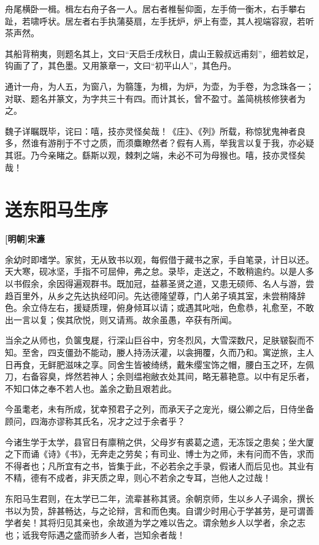 \documentclass[UTF8,titlepage,oneside]{ctexbook}
\begin{document}
舟尾横卧一楫。楫左右舟子各一人。居右者椎髻仰面，左手倚一衡木，右手攀右趾，若啸呼状。居左者右手执蒲葵扇，左手抚炉，炉上有壶，其人视端容寂，若听茶声然。


其船背稍夷，则题名其上，文曰“天启壬戌秋日，虞山王毅叔远甫刻”，细若蚊足，钩画了了，其色墨。又用篆章一，文曰“初平山人”，其色丹。


通计一舟，为人五，为窗八，为篛篷，为楫，为炉，为壶，为手卷，为念珠各一；对联、题名并篆文，为字共三十有四。而计其长，曾不盈寸。盖简桃核修狭者为之。


魏子详瞩既毕，诧曰：嘻，技亦灵怪矣哉！《庄》、《列》所载，称惊犹鬼神者良多，然谁有游削于不寸之质，而须麋瞭然者？假有人焉，举我言以复于我，亦必疑其诳。乃今亲睹之。繇斯以观，棘刺之端，未必不可为母猴也。嘻，技亦灵怪矣哉！



\chapter*{送东阳马生序}
\begin{center}
	\textbf{[明朝]宋濂}
\end{center}

余幼时即嗜学。家贫，无从致书以观，每假借于藏书之家，手自笔录，计日以还。天大寒，砚冰坚，手指不可屈伸，弗之怠。录毕，走送之，不敢稍逾约。以是人多以书假余，余因得遍观群书。既加冠，益慕圣贤之道，又患无硕师、名人与游，尝趋百里外，从乡之先达执经叩问。先达德隆望尊，门人弟子填其室，未尝稍降辞色。余立侍左右，援疑质理，俯身倾耳以请；或遇其叱咄，色愈恭，礼愈至，不敢出一言以复；俟其欣悦，则又请焉。故余虽愚，卒获有所闻。


当余之从师也，负箧曳屣，行深山巨谷中，穷冬烈风，大雪深数尺，足肤皲裂而不知。至舍，四支僵劲不能动，媵人持汤沃灌，以衾拥覆，久而乃和。寓逆旅，主人日再食，无鲜肥滋味之享。同舍生皆被绮绣，戴朱缨宝饰之帽，腰白玉之环，左佩刀，右备容臭，烨然若神人；余则缊袍敝衣处其间，略无慕艳意。以中有足乐者，不知口体之奉不若人也。盖余之勤且艰若此。


今虽耄老，未有所成，犹幸预君子之列，而承天子之宠光，缀公卿之后，日侍坐备顾问，四海亦谬称其氏名，况才之过于余者乎？


今诸生学于太学，县官日有廪稍之供，父母岁有裘葛之遗，无冻馁之患矣；坐大厦之下而诵《诗》《书》，无奔走之劳矣；有司业、博士为之师，未有问而不告，求而不得者也；凡所宜有之书，皆集于此，不必若余之手录，假诸人而后见也。其业有不精，德有不成者，非天质之卑，则心不若余之专耳，岂他人之过哉！


东阳马生君则，在太学已二年，流辈甚称其贤。余朝京师，生以乡人子谒余，撰长书以为贽，辞甚畅达，与之论辩，言和而色夷。自谓少时用心于学甚劳，是可谓善学者矣！其将归见其亲也，余故道为学之难以告之。谓余勉乡人以学者，余之志也；诋我夸际遇之盛而骄乡人者，岂知余者哉！
\end{document}
